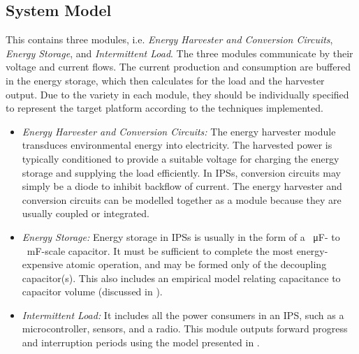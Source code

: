\subsection{System Model}

This contains three modules, i.e. \textit{Energy Harvester and Conversion Circuits}, \textit{Energy Storage}, and \textit{Intermittent Load}. 
The three modules communicate by their voltage and current flows.
The current production  and consumption  are buffered in the energy storage, which then calculates  for the load and the harvester output. 
Due to the variety in each module, they should be individually specified to represent the target platform according to the techniques implemented. 

\begin{itemize}
    \item \textit{Energy Harvester and Conversion Circuits:} The energy harvester module transduces environmental energy into electricity. 
    The harvested power is typically conditioned to provide a suitable voltage for charging the energy storage and supplying the load efficiently. 
    In IPSs, conversion circuits may simply be a diode to inhibit backflow of current.
    The energy harvester and conversion circuits can be modelled together as a module because they are usually coupled or integrated. 
    \item \textit{Energy Storage:} Energy storage in IPSs is usually in the form of a \SI{}{\micro\farad}-  to \SI{}{\milli\farad}-scale capacitor. 
    It must be sufficient to complete the most energy-expensive atomic operation, and may be formed only of the decoupling capacitor(s). 
    This also includes an empirical model relating capacitance to capacitor volume (discussed in ).
    \item \textit{Intermittent Load:} It includes all the power consumers in an IPS, such as a microcontroller, sensors, and a radio. 
    This module outputs forward progress and interruption periods using the model presented in .
\end{itemize}


